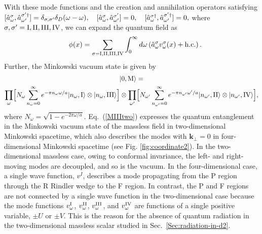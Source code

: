\documentclass[aps,prd,preprintnumbers,nofootinbib,showpacs,11pt]{revtex4}%
\begin{document}
\begin{widetext}
With these mode functions and the creation and annihilation operators satisfying
$[\hat a^{\rm \sigma}_{\omega},\hat a^{\rm \sigma'\dagger}_{\omega'}]=\delta_{\sigma,\sigma'}\delta_D(\omega-\omega), 
~~~
[\hat a^{\rm \sigma}_{\omega},\hat a^{\rm \sigma'}_{\omega'}]=0, 
~~~
[\hat a^{\rm \sigma\dagger}_{\omega},\hat a^{\rm \sigma'\dagger}_{\omega'}]=0,
$
where $\sigma,\sigma'={\rm I,II,III,IV}$, we can expand the quantum field as
\begin{eqnarray}
&&\phi(x)=\sum_{\sigma={\rm I,II,III,IV}}\int_0^\infty d\omega
\left(
\hat a^\sigma_{\omega}v^\sigma_{\omega}(x)+{\rm h.c.}
\right).
\end{eqnarray}
Further, the Minkowski vacuum state is given by
\begin{multline}
  |0,{\rm M}\rangle=\\
  \prod_\omega\Bigl[
N_\omega\sum_{n_\omega=0}^\infty e^{-\pi n_\omega \omega/a }|n_\omega,{\I}\rangle \otimes|n_\omega,{\III}\rangle
\Bigr]\otimes 
\prod_{\omega'}\Bigl[
N_{\omega'}\sum_{n_{\omega'}=0}^\infty e^{-\pi n_{\omega'} \omega'/a }|n_{\omega'},{\II}\rangle \otimes|n_{\omega'},{\IV}\rangle
\Bigr] ,
\label{MIIItwo}
\end{multline}
where $N_\omega=\sqrt{1-e^{-2\pi \omega/a}}$. %
Eq.~(\ref{MIIItwo}) expresses the quantum entanglement in the Minkowski vacuum 
state of the massless field in two-dimensional Minkowski spacetime, 
which also describes the modes with $\bm k_\perp=0$ in four-dimensional Minkowski spacetime
(see Fig. \ref{fig:coordinate2}). 
In the two-dimensional massless case, owing to conformal invariance, the left- and right-moving modes
are decoupled, and so is the vacuum. In the four-dimensional case, a single wave function, $v^I$, describes
a mode propagating from the P region through the R Rindler wedge to the F region. 
In contrast, the P and F regions are not connected by a single wave function in the two-dimensional case
because the mode functions $v_\omega^{\rm I}$, $v_\omega^{\rm II}$, $v_\omega^{\rm III}$, and $v_\omega^{\rm IV}$
are functions of a single positive variable, $\pm U$ or $\pm V$.  
This is the reason for the absence of quantum radiation in the two-dimensional massless scalar studied 
in Sec.~\ref{Sec:radiation-in-d2}.




\end{widetext}
\end{document}
